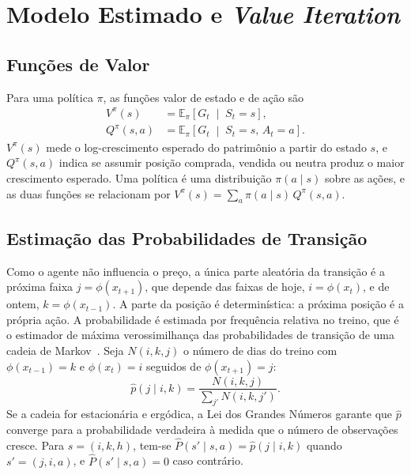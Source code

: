 \documentclass[conference]{IEEEtran}
\begin{document}
\section{Modelo Estimado e \textit{Value Iteration}}
\label{sec:modelo}

\subsection{Funções de Valor}

Para uma política $\pi$, as funções valor de estado e de ação são
\begin{align}
  V^\pi(s)   &= \mathbb{E}_\pi\left[G_t \;\middle|\; S_t = s\right], \\
  Q^\pi(s,a) &= \mathbb{E}_\pi\left[G_t \;\middle|\; S_t = s,\, A_t = a\right].
\end{align}
$V^\pi(s)$ mede o log-crescimento esperado do patrimônio a partir do estado $s$, e $Q^\pi(s,a)$ indica se assumir posição comprada, vendida ou neutra produz o maior crescimento esperado. Uma política é uma distribuição $\pi(a \mid s)$ sobre as ações, e as duas funções se relacionam por $V^\pi(s) = \sum_{a} \pi(a \mid s)\, Q^\pi(s,a)$.

\subsection{Estimação das Probabilidades de Transição}

Como o agente não influencia o preço, a única parte aleatória da transição é a próxima faixa $j = \phi(x_{t+1})$, que depende das faixas de hoje, $i = \phi(x_t)$, e de ontem, $k = \phi(x_{t-1})$. A parte da posição é determinística: a próxima posição é a própria ação. A probabilidade é estimada por frequência relativa no treino, que é o estimador de máxima verossimilhança das probabilidades de transição de uma cadeia de Markov~\cite{anderson1957}. Seja $N(i,k,j)$ o número de dias do treino com $\phi(x_{t-1}) = k$ e $\phi(x_t) = i$ seguidos de $\phi(x_{t+1}) = j$:
\begin{equation}
  \hat{p}(j \mid i,k) = \frac{N(i,k,j)}{\sum_{j'} N(i,k,j')}.
\end{equation}
Se a cadeia for estacionária e ergódica, a Lei dos Grandes Números garante que $\hat{p}$ converge para a probabilidade verdadeira à medida que o número de observações cresce. Para $s = (i,k,h)$, tem-se $\hat{P}(s' \mid s,a) = \hat{p}(j \mid i,k)$ quando $s' = (j,i,a)$, e $\hat{P}(s' \mid s,a) = 0$ caso contrário.
\end{document}
